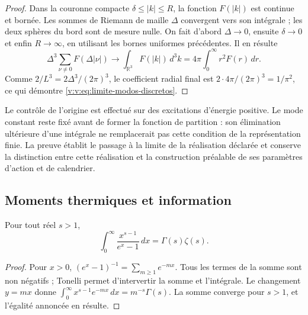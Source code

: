 \begin{proof}
Dans la couronne compacte \(\delta\leq|k|\leq R\), la fonction
\(F(|k|)\) est continue et bornée. Les sommes de Riemann de maille
\(\Delta\) convergent vers son intégrale ; les deux sphères du bord
sont de mesure nulle. On fait d’abord \(\Delta\to0\), ensuite
\(\delta\to0\) et enfin \(R\to\infty\), en utilisant les bornes
uniformes précédentes. Il en résulte
\[
 \Delta^3\sum_{\nu\ne0}F(\Delta|\nu|)
 \longrightarrow \int_{\mathbb R^3}F(|k|)\,d^3k
 =4\pi\int_0^\infty r^2F(r)\,dr.
\]
Comme \(2/L^3=2\Delta^3/(2\pi)^3\), le coefficient radial final
est \(2\cdot4\pi/(2\pi)^3=1/\pi^2\), ce qui démontre
\eqref{v:v:eq:limite-modos-discretos}.
\end{proof}

Le contrôle de l’origine est effectué sur des excitations d’énergie positive.
Le mode constant reste fixé avant de former la fonction de partition :
son élimination ultérieure d’une intégrale ne remplacerait pas cette condition de
la représentation finie. La preuve établit le passage à la limite de la
réalisation déclarée et conserve la distinction entre cette réalisation et
la construction préalable de ses paramètres d’action et de calendrier.



\subsection{Moments thermiques et information}

\begin{lemma}
\label{v:v:lem:momento-bosonico}
Pour tout réel \(s>1\),
\begin{equation}
 \int_0^\infty\frac{x^{s-1}}{e^x-1}\,dx
 =\Gamma(s)\zeta(s).
 \label{v:v:eq:momento-bosonico}
\end{equation}
\end{lemma}
\begin{proof}
Pour \(x>0\), \((e^x-1)^{-1}=\sum_{m\geq1}e^{-mx}\).
Tous les termes de la somme sont non négatifs ; Tonelli permet d’intervertir la somme
et l’intégrale. Le changement \(y=mx\) donne
\(\int_0^\infty x^{s-1}e^{-mx}\,dx=m^{-s}\Gamma(s)\).
La somme converge pour \(s>1\), et l’égalité annoncée en résulte.
\end{proof}


